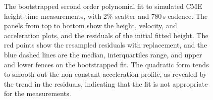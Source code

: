 \documentclass[structabstract]{aa}
\begin{document}
\begin{figure}[t]
\centering
{}
\caption{The bootstrapped second order polynomial fit to simulated CME height-time measurements, with 2\% scatter and 780\,s cadence. The panels from top to bottom show the height, velocity, and acceleration plots, and the residuals of the initial fitted height. The red points show the resampled residuals with replacement, and the blue dashed lines are the median, interquartiles range, and upper and lower fences on the bootstrapped fit. The quadratic form tends to smooth out the non-constant acceleration profile, as revealed by the trend in the residuals, indicating that the fit is not appropriate for the measurements.}
\label{fig_quadratic}
\end{figure}
\end{document}

